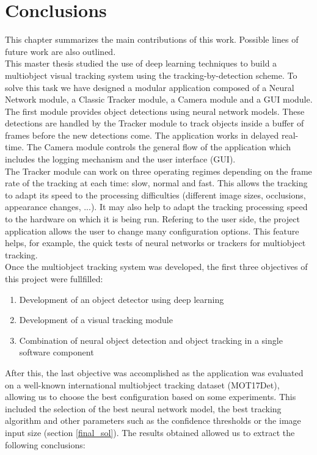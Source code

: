 \chapter{Conclusions}
This chapter summarizes the main contributions of this work. Possible lines of future work are also outlined.\\
This master thesis studied the use of deep learning techniques to build a multiobject visual tracking system using the tracking-by-detection scheme. To solve this task we have designed a modular application composed of a Neural Network module, a Classic Tracker module, a Camera module and a GUI module. The first module provides object detections using neural network models. These detections are handled by the Tracker module to track objects inside a buffer of frames before the new detections come. The application works in delayed real-time. The Camera module controls the general flow of the application which includes the logging mechanism and the user interface (GUI).\\
The Tracker module can work on three operating regimes depending on the frame rate of the tracking at each time: slow, normal and fast. This allows the tracking to adapt its speed to the processing difficulties (different image sizes, occlusions, appearance changes, ...). It may also help to adapt the tracking processing speed to the hardware on which it is being run.
Refering to the user side, the project application allows the user to change many configuration options. This feature helps, for example, the quick tests of neural networks or trackers for multiobject tracking.\\
Once the multiobject tracking system was developed, the first three objectives of this project were fullfilled:
\begin{enumerate}
    \item Development of an object detector using deep learning
    \item Development of a visual tracking module
    \item Combination of neural object detection and object tracking in a single software component
\end{enumerate}
After this, the last objective was accomplished as the application was evaluated on a well-known international multiobject tracking dataset (MOT17Det), allowing us to choose the best configuration based on some experiments. This included the selection of the best neural network model, the best tracking algorithm and other parameters such as the confidence thresholds or the image input size (section \ref{final_sol}). The results obtained allowed us to extract the following conclusions:

